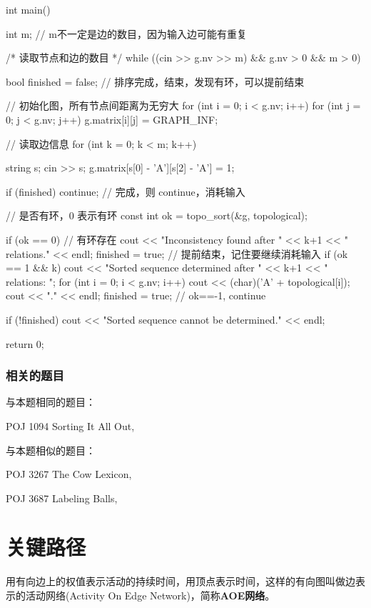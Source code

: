 \begin{Codex}[label=poj_1094.cpp]
int main() {
    int m;  // m不一定是边的数目，因为输入边可能有重复

    /* 读取节点和边的数目 */
    while ((cin >> g.nv >> m) && g.nv > 0 && m > 0) {
        bool finished = false;  // 排序完成，结束，发现有环，可以提前结束

        // 初始化图，所有节点间距离为无穷大
        for (int i = 0; i < g.nv; i++)
            for (int j = 0; j < g.nv; j++)
                g.matrix[i][j] = GRAPH_INF;

        // 读取边信息
        for (int k = 0; k < m; k++) {
            string s;
            cin >> s;
            g.matrix[s[0] - 'A'][s[2] - 'A'] = 1;

            if (finished) continue;    // 完成，则 continue，消耗输入

            // 是否有环，0 表示有环
            const int ok = topo_sort(&g, topological);

            if (ok == 0) {  // 有环存在
                cout << "Inconsistency found after " << k+1 <<
                        " relations." << endl;
                finished = true;  // 提前结束，记住要继续消耗输入
            }
            if (ok == 1 && k) {
                cout << "Sorted sequence determined after " << k+1
                        << " relations: ";
                for (int i = 0; i < g.nv; i++) {
                    cout << (char)('A' + topological[i]);
                }
                cout << "." << endl;
                finished = true;
            }
            // ok==-1, continue
        }
        if (!finished) {
            cout << "Sorted sequence cannot be determined." << endl;
        }
    }
    return 0;
}
\end{Codex}

\subsubsection{相关的题目}
与本题相同的题目：
\begindot
\item POJ 1094 Sorting It All Out, 
\myenddot

与本题相似的题目：
\begindot
\item POJ 3267 The Cow Lexicon, 
\item POJ 3687 Labeling Balls, 
\myenddot


\section{关键路径} %
用有向边上的权值表示活动的持续时间，用顶点表示时间，这样的有向图叫做边表示的活动网络(Activity On Edge Network)，简称\textbf{AOE网络}。

